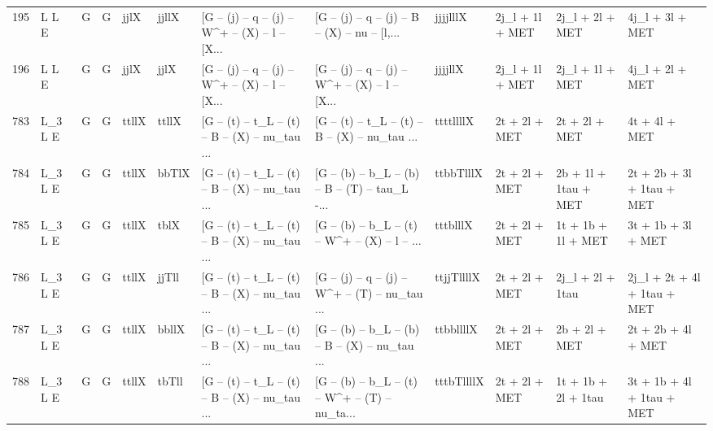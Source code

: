 \begin{tabular}{llllllllllll}
195  &        L L E &     G &     G &        jjlX &       jjllX &  [G -- (j) -- q -- (j) -- W\textasciicircum + -- (X) -- l -- [X... &  [G -- (j) -- q -- (j) -- B -- (X) -- nu -- [l,... &    jjjjlllX &          2j\_l + 1l + MET &          2j\_l + 2l + MET &                    4j\_l + 3l + MET \\
196  &        L L E &     G &     G &        jjlX &        jjlX &  [G -- (j) -- q -- (j) -- W\textasciicircum + -- (X) -- l -- [X... &  [G -- (j) -- q -- (j) -- W\textasciicircum + -- (X) -- l -- [X... &     jjjjllX &          2j\_l + 1l + MET &          2j\_l + 1l + MET &                    4j\_l + 2l + MET \\
783  &      L\_3 L E &     G &     G &       ttllX &       ttllX &  [G -- (t) -- t\_L -- (t) -- B -- (X) -- nu\_tau ... &  [G -- (t) -- t\_L -- (t) -- B -- (X) -- nu\_tau ... &   ttttllllX &            2t + 2l + MET &            2t + 2l + MET &                      4t + 4l + MET \\
784  &      L\_3 L E &     G &     G &       ttllX &       bbTlX &  [G -- (t) -- t\_L -- (t) -- B -- (X) -- nu\_tau ... &  [G -- (b) -- b\_L -- (b) -- B -- (T) -- tau\_L -... &   ttbbTlllX &            2t + 2l + MET &     2b + 1l + 1tau + MET &          2t + 2b + 3l + 1tau + MET \\
785  &      L\_3 L E &     G &     G &       ttllX &        tblX &  [G -- (t) -- t\_L -- (t) -- B -- (X) -- nu\_tau ... &  [G -- (b) -- b\_L -- (t) -- W\textasciicircum + -- (X) -- l -- ... &    tttblllX &            2t + 2l + MET &       1t + 1b + 1l + MET &                 3t + 1b + 3l + MET \\
786  &      L\_3 L E &     G &     G &       ttllX &       jjTll &  [G -- (t) -- t\_L -- (t) -- B -- (X) -- nu\_tau ... &  [G -- (j) -- q -- (j) -- W\textasciicircum + -- (T) -- nu\_tau ... &  ttjjTllllX &            2t + 2l + MET &         2j\_l + 2l + 1tau &        2j\_l + 2t + 4l + 1tau + MET \\
787  &      L\_3 L E &     G &     G &       ttllX &       bbllX &  [G -- (t) -- t\_L -- (t) -- B -- (X) -- nu\_tau ... &  [G -- (b) -- b\_L -- (b) -- B -- (X) -- nu\_tau ... &   ttbbllllX &            2t + 2l + MET &            2b + 2l + MET &                 2t + 2b + 4l + MET \\
788  &      L\_3 L E &     G &     G &       ttllX &       tbTll &  [G -- (t) -- t\_L -- (t) -- B -- (X) -- nu\_tau ... &  [G -- (b) -- b\_L -- (t) -- W\textasciicircum + -- (T) -- nu\_ta... &  tttbTllllX &            2t + 2l + MET &      1t + 1b + 2l + 1tau &          3t + 1b + 4l + 1tau + MET \\

\end{tabular}
